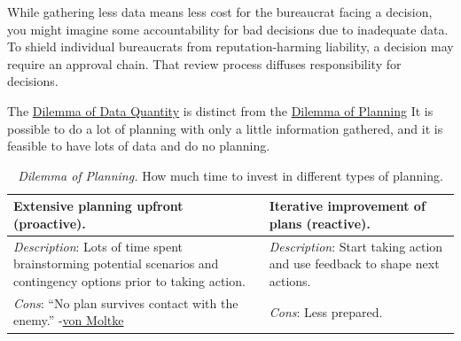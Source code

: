 While gathering less data means less cost for the bureaucrat facing a decision, you might imagine some accountability for bad decisions due to inadequate data. To shield individual bureaucrats from reputation-harming liability, a decision may require an approval chain. That review process diffuses responsibility for decisions.


The \hyperref[table:dilemma-personal-gather-data-lots-vs-little]{Dilemma of Data Quantity} 
 is  distinct from the \hyperref[table:dilemma-personal-planning-vs-iterate]{Dilemma of Planning}
\iftoggle{printedonpaper}{ (\ref{table:dilemma-personal-planning-vs-iterate}).}{.} It 
is possible to do a lot of planning with only a little information gathered, and it is feasible to have lots of data and do no planning. 

\begin{center}
\begin{table}[H] %
\begin{tabular}{ | m{\dilemmatablewidth}| m{\dilemmatablewidth} | } 
  \hline
  \textbf{Extensive planning upfront (proactive).} & 
  \textbf{Iterative improvement of plans (reactive).} \\ 
  \hline
  \textit{Description}: Lots of time spent brainstorming potential scenarios and contingency options prior to taking action. & 
  \textit{Description}: Start taking action and use feedback to shape next actions. \\ 
  \hline
  \textit{Cons}: ``No plan survives contact with the enemy.'' {\small -\href{https://en.wikipedia.org/wiki/Helmuth_von_Moltke_the_Elder}{von Moltke}
  \index{Wikipedia!Moltke@\href{https://en.wikipedia.org/wiki/Helmuth_von_Moltke_the_Elder}{Moltke, Helmuth von}}
  } & 
  \textit{Cons}: Less prepared. \\  
  \hline
\end{tabular}
\caption{
\textit{Dilemma of Planning.}
How much time to invest in different types of planning.
}
\label{table:dilemma-personal-planning-vs-iterate}
\end{table}
\end{center}

